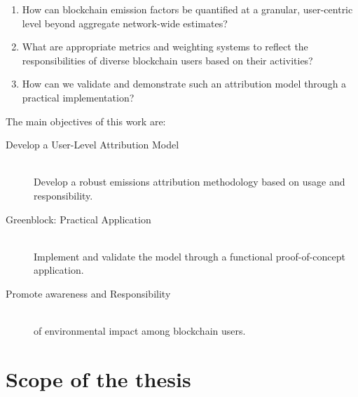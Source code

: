 \documentclass[11pt]{report}
\begin{document}
\begin{enumerate}
    \item How can blockchain emission factors be quantified at a granular, user-centric level beyond aggregate network-wide estimates?
    \item What are appropriate metrics and weighting systems to reflect the responsibilities of diverse blockchain users based on their activities?
    \item How can we validate and demonstrate such an attribution model through a practical implementation?
\end{enumerate}

The main objectives of this work are:

\begin{description}

    \item [Develop a User-Level Attribution Model] \hfill \\
          Develop a robust emissions attribution methodology based on usage and responsibility.
    \item [Greenblock: Practical Application] \hfill \\
          Implement and validate the model through a functional proof-of-concept application.
    \item [Promote awareness and Responsibility] \hfill \\
          of environmental impact among blockchain users.
\end{description}

\section{Scope of the thesis}
\end{document}
